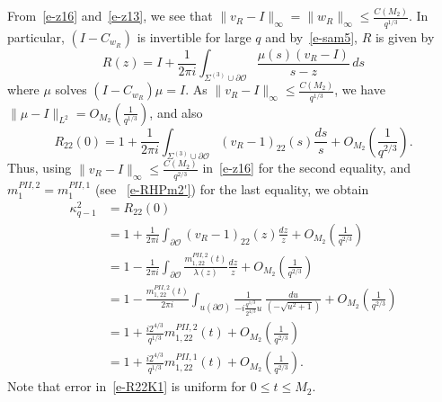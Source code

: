 \documentclass{amsart}
\theoremstyle{definition}
\theoremstyle{remark}
\numberwithin{equation}{section}
\begin{document}
From~\eqref{e-z16} and~\eqref{e-z13}, we see that 
$\|v_R-I\|_\infty=\|w_R\|_\infty\le\frac{C(M_2)}{q^{1/3}}$.
In particular, $(I-C_{w_R})$ is invertible for large $q$ and 
by~\eqref{e-sam5}, $R$ is given by
$$R(z)=I+\frac1{2\pi i} \int_{\Sigma^{(3)}\cup\partial\mathcal{O}} 
\frac{\mu(s)(v_R-I)}{s-z} \,ds$$
where $\mu$ solves $(I-C_{w_R})\mu=I.$
As $\|v_R-I\|_\infty\le\frac{C(M_2)}{q^{1/3}}$, we have 
$\|\mu-I\|_{L^2}=O_{M_2}(\frac1{q^{1/3}})$, and also   
$$R_{22}(0)=1+\frac1{2\pi i} \int_{\Sigma^{(3)}\cup\partial\mathcal{O}} 
(v_R-1)_{22}(s) \frac{ds}{s} 
+O_{M_2}(\frac1{q^{2/3}}).$$
Thus, using $\|v_R-I\|_\infty\le\frac{C(M_2)}{q^{2/3}}$ in~\eqref{e-z16} 
for the second equality, and  $m^{PII,2}_1=m^{PII,1}_1$ 
(see ~\eqref{e-RHPm2'}) for the last equality, we obtain 
\begin{equation}\label{e-R22K1}
  \begin{split}
    \kappa^2_{q-1}&=R_{22}(0)\\
    &= 1+\frac1{2\pi i} \int_{\partial\mathcal{O}} (v_R-1)_{22}(z) \frac{dz}{z} 
+O_{M_2}(\frac1{q^{2/3}})\\
    &=1-\frac1{2\pi i} \int_{\partial\mathcal{O}} 
\frac{m^{PII,2}_{1,22}(t)}{\lambda(z)} \frac{dz}{z} +
O_{M_2}(\frac1{q^{2/3}})\\
    &=1-\frac{m^{PII,2}_{1,22}(t)}{2\pi i} \int_{u(\partial\mathcal{O})} 
\frac{1}{-i\frac{q^{1/3}}{2^{4/3}}u} \,\frac{du}
{(-\sqrt{u^2+1})} +O_{M_2}(\frac1{q^{2/3}})\\
    &=1+\frac{i2^{4/3}}{q^{1/3}}m^{PII,2}_{1,22}(t)+O_{M_2}(\frac1{q^{2/3}})\\
    &=1+\frac{i2^{4/3}}{q^{1/3}}m^{PII,1}_{1,22}(t)+O_{M_2}(\frac1{q^{2/3}}).
  \end{split}
\end{equation}
Note that error in~\eqref{e-R22K1} is uniform for $0\le t\le M_2.$
\end{document}
